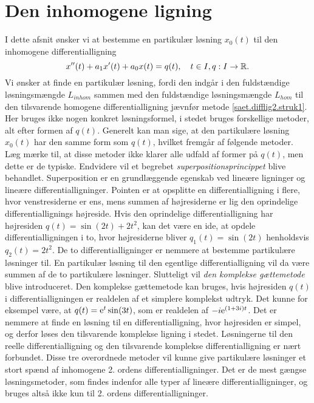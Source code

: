 
\section{Den inhomogene ligning} \label{subsek.difflig2.inhom1}

I dette afsnit ønsker vi at bestemme en partikulær løsning $ x_0(t) $ til den inhomogene differentialligning
\begin{equation}
x''(t) + a_1x'(t) + a_0x(t) = q(t), \quad t \in I, q : I \rightarrow \mathbb{R}.
\end{equation}
Vi ønsker at finde en partikulær løsning, fordi den indgår i den fuldstændige løs\-nings\-mæng\-de $ L_{inhom} $ sammen med den fuldstændige løsningsmængde $ L_{hom} $ til den tilsvarende homogene differentialligning jævnfør metode \ref{saet.difflig2.struk1}. \bs
Her bruges ikke nogen konkret løsningsformel, i stedet bruges forskellige metoder, alt efter formen af $ q(t) $. Generelt kan man sige, at den partikulære løsning $ x_0(t) $ har den samme form som $ q(t) $, hvilket fremgår af følgende metoder. Læg mærke til, at disse metoder ikke klarer alle udfald af former på $ q(t) $, men dette er de typiske. \bs
Endvidere vil et begrebet \textit{superpositionsprincippet} blive behandlet. Superposition er en grundlæggende egenskab ved lineære ligninger og lineære differentialligninger. Pointen er at opsplitte en differentialligning i flere, hvor venstresiderne er ens, mens summen af højresiderne er lig den oprindelige differentiallignings højreside. Hvis den oprindelige differentialligning har højresiden $ q(t) = \sin(2t) + 2t^2 $, kan det være en ide, at opdele differentialligningen i to, hvor højresiderne bliver $ q_1(t) = \sin(2t) $ henholdsvis $ q_2(t) = 2t^2 $. De to differentialligninger er nemmere at bestemme partikulære løsninger til. En partikulær løsning til den egentlige differentialligning vil da være summen af de to partikulære løsninger. \bs
Slutteligt vil \textit{den komplekse gættemetode} blive introduceret. Den komplekse gættemetode kan bruges, hvis højresiden $ q(t) $ i differentialligningen er realdelen af et simplere komplekst udtryk. Det kunne for eksempel være, at $ q(t) = \mathrm{e}^t \sin(3t) $, som er realdelen af $ -i \mathrm{e}^{(1+3i)t} $. Det er nemmere at finde en løsning til en differentialligning, hvor højresiden er simpel, og derfor løses den tilsvarende komplekse ligning i stedet. Løsningerne til den reelle differentialligning og den tilsvarende komplekse differentialligning er nært forbundet. \bs
Disse tre overordnede metoder vil kunne give partikulære løsninger et stort spænd af inhomogene 2. ordens differentialligninger. Det er de mest gængse løsningsmetoder, som findes indenfor alle typer af lineære differentialligninger, og bruges altså ikke kun til 2. ordens differentialligninger.

